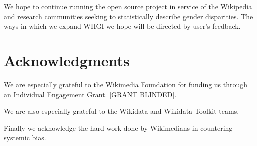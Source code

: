 \documentclass{sig-alternate-05-2015}
\begin{document}
We hope to continue running the open source project in service of the Wikipedia and research communities seeking to statistically describe gender disparities. The ways in which we expand WHGI we hope will be directed by user's feedback.

\section{ Acknowledgments}
We are especially grateful to the Wikimedia Foundation for funding us through an Individual Engagement Grant. [GRANT BLINDED].

We are also especially grateful to the Wikidata and Wikidata Toolkit teams.

Finally we acknowledge the hard work done by Wikimedians in  countering systemic bias.


%

\end{document}
